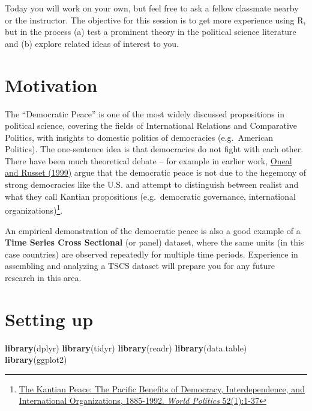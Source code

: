 \documentclass[]{book}
\newenvironment{Shaded}{\begin{snugshade}}{\end{snugshade}}
\newcommand{\KeywordTok}[1]{\textcolor[rgb]{0.13,0.29,0.53}{\textbf{#1}}}
\newcommand{\NormalTok}[1]{#1}
\let\rmarkdownfootnote\footnote%
\def\footnote{\protect\rmarkdownfootnote}
\theoremstyle{definition}
\theoremstyle{definition}
\theoremstyle{definition}
\theoremstyle{remark}
\begin{document}
Today you will work on your own, but feel free to ask a fellow classmate
nearby or the instructor. The objective for this session is to get more
experience using R, but in the process (a) test a prominent theory in
the political science literature and (b) explore related ideas of
interest to you.

\section{Motivation}\label{motivation-1}

The ``Democratic Peace'' is one of the most widely discussed
propositions in political science, covering the fields of International
Relations and Comparative Politics, with insights to domestic politics
of democracies (e.g.~American Politics). The one-sentence idea is that
democracies do not fight with each other. There have been much
theoretical debate -- for example in earlier work,
\href{https://blackboard.angelo.edu/bbcswebdav/institution/LFA/CSS/Course\%20Material/SEC6302/Readings/Lesson_3/Oneal-Russett.pdf}{Oneal
and Russet (1999)} argue that the democratic peace is not due to the
hegemony of strong democracies like the U.S. and attempt to distinguish
between realist and what they call Kantian propositions (e.g.~democratic
governance, international organizations)\footnote{\href{https://blackboard.angelo.edu/bbcswebdav/institution/LFA/CSS/Course\%20Material/SEC6302/Readings/Lesson_3/Oneal-Russett.pdf}{The
  Kantian Peace: The Pacific Benefits of Democracy, Interdependence, and
  International Organizations, 1885-1992. \emph{World Politics}
  52(1):1-37}}.

An empirical demonstration of the democratic peace is also a good
example of a \textbf{Time Series Cross Sectional} (or panel) dataset,
where the same units (in this case countries) are observed repeatedly
for multiple time periods. Experience in assembling and analyzing a TSCS
dataset will prepare you for any future research in this area.

\section{Setting up}\label{setting-up}

\begin{Shaded}
\begin{Highlighting}[]
\KeywordTok{library}\NormalTok{(dplyr)}
\KeywordTok{library}\NormalTok{(tidyr)}
\KeywordTok{library}\NormalTok{(readr)}
\KeywordTok{library}\NormalTok{(data.table)}
\KeywordTok{library}\NormalTok{(ggplot2)}
\end{Highlighting}
\end{Shaded}
\end{document}
